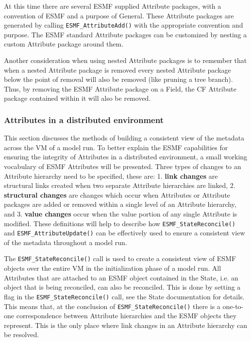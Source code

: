 At this time there are several ESMF supplied Attribute packages, with a convention of ESMF and a purpose of General.  These Attribute packages are generated by calling {\tt ESMF\_AttributeAdd()} with the appropriate convention and purpose.  The ESMF standard Attribute packages can be customized by nesting a custom Attribute package around them.

Another consideration when using nested Attribute packages is to remember that when a nested Attribute package is removed every nested Attribute package below the point of removal will also be removed (like pruning a tree branch).  Thus, by removing the ESMF Attribute package on a Field, the CF Attribute package contained within it will also be removed.

\subsubsection{Attributes in a distributed environment}
\label{sec:Att:Dist}

This section discusses the methods of building a consistent view of the metadata across the VM of a model run.  To better explain the ESMF capabilities for ensuring the integrity of Attributes in a distributed environment, a small working vocabulary of ESMF Attributes will be presented.  Three types of changes to an Attribute hierarchy need to be specified, these are: 1. {\bf link changes} are structural links created when two separate Attribute hierarchies are linked, 2. {\bf structural changes} are changes which occur when Attributes or Attribute packages are added or removed within a single level of an Attribute hierarchy, and 3. {\bf value changes} occur when the value portion of any single Attribute is modified.  These definitions will help to describe how {\tt ESMF\_StateReconcile()} and {\tt ESMF\_AttributeUpdate()} can be effectively used to ensure a consistent view of the metadata throughout a model run.

The {\tt ESMF\_StateReconcile()} call is used to create a consistent view of ESMF objects over the entire VM in the initialization phase of a model run.  All Attributes that are attached to an ESMF object contained in the State, i.e. an object that is being reconciled, can also be reconciled.  This is done by setting a flag in the {\tt ESMF\_StateReconcile()} call, see the State documentation for details.  This means that, at the conclusion of {\tt ESMF\_StateReconcile()} there is a one-to-one correspondence between Attribute hierarchies and the ESMF objects they represent.  This is the only place where link changes in an Attribute hierarchy can be resolved.

